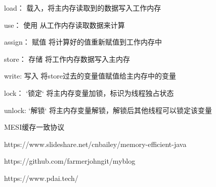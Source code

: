 load： 载入，将主内存读取到的数据写入工作内存

use： 使用 从工作内存读取数据来计算

assign： 赋值 将计算好的值重新赋值到工作内存中

store： 存储 将工作内存数据写入主内存

write: 写入 将store过去的变量值赋值给主内存中的变量

lock： `锁定` 将主内存变量加锁，标识为线程独占状态

unlock: `解锁` 将主内存变量解锁，解锁后其他线程可以锁定该变量




MESI缓存一致协议








https://www.slideshare.net/cnbailey/memory-efficient-java


https://github.com/farmerjohngit/myblog



https://www.pdai.tech/

